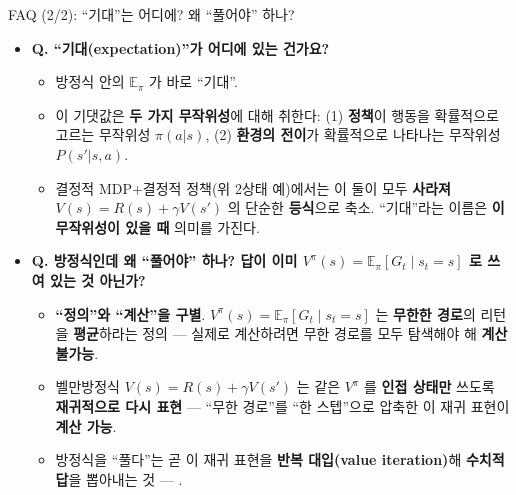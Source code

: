 \documentclass[aspectratio=169,11pt]{beamer}
\begin{document}
\begin{frame}{FAQ (2/2): ``기대''는 어디에? 왜 ``풀어야'' 하나?}
  \begin{itemize}
    \item \textbf{Q. ``기대(expectation)''가 어디에 있는 건가요?}
      \begin{itemize}
        \item 방정식 안의 $\mathbb{E}_\pi$ 가 바로 ``기대''.
        \item 이 기댓값은 \textbf{두 가지 무작위성}에 대해
          취한다: (1) \textbf{정책}이 행동을 확률적으로 고르는
          무작위성 $\pi(a|s)$, (2) \textbf{환경의 전이}가
          확률적으로 나타나는 무작위성 $P(s'|s,a)$.
        \item 결정적 MDP+결정적 정책(위 2상태 예)에서는 이 둘이
          모두 \textbf{사라져} $V(s) = R(s) + \gamma V(s')$ 의
          단순한 \textbf{등식}으로 축소. ``기대''라는 이름은
          \textbf{이 무작위성이 있을 때} 의미를 가진다.
      \end{itemize}
    \item \textbf{Q. 방정식인데 왜 ``풀어야'' 하나? 답이 이미
      $V^\pi(s) = \mathbb{E}_\pi[G_t \mid s_t=s]$ 로 쓰여 있는
      것 아닌가?}
      \begin{itemize}
        \item \textbf{``정의''와 ``계산''을 구별}. $V^\pi(s) =
          \mathbb{E}_\pi[G_t\mid s_t=s]$ 는 \textbf{무한한 경로}의
          리턴을 \textbf{평균}하라는 정의 --- 실제로 계산하려면
          무한 경로를 모두 탐색해야 해 \textbf{계산 불가능}.
        \item 벨만방정식 $V(s) = R(s) + \gamma V(s')$ 는 같은
          $V^\pi$ 를 \textbf{인접 상태만} 쓰도록 \textbf{재귀적으로
          다시 표현} --- ``무한 경로''를 ``한 스텝''으로 압축한
          이 재귀 표현이 \textbf{계산 가능}.
        \item 방정식을 ``풀다''는 곧 이 재귀 표현을 \textbf{반복
          대입(value iteration)}해 \textbf{수치적 답}을 뽑아내는 것
          --- .
      \end{itemize}
  \end{itemize}
\end{frame}
\end{document}
